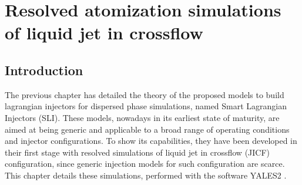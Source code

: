 \chapter{Resolved atomization simulations of liquid jet in crossflow}

\label{ch5:jicf_resolved_simulations}

%
%
%	
%	
%	
%	
%	
%	
%	
%		
%			
%			
%	
%		
%	
%		
%			
%		
%
%

\section{Introduction}

The previous chapter has detailed the theory of the proposed models to build lagrangian injectors for dispersed phase simulations, named Smart Lagrangian Injectors (SLI). These models, nowadays in its earliest state of maturity, are aimed at being generic and applicable to a broad range of operating conditions and injector configurations. To show its capabilities, they have been developed in their first stage with resolved simulations of liquid jet in crossflow (JICF) configuration, since generic injection models for such configuration are scarce. This chapter details these simulations, performed with the software YALES2 . %

